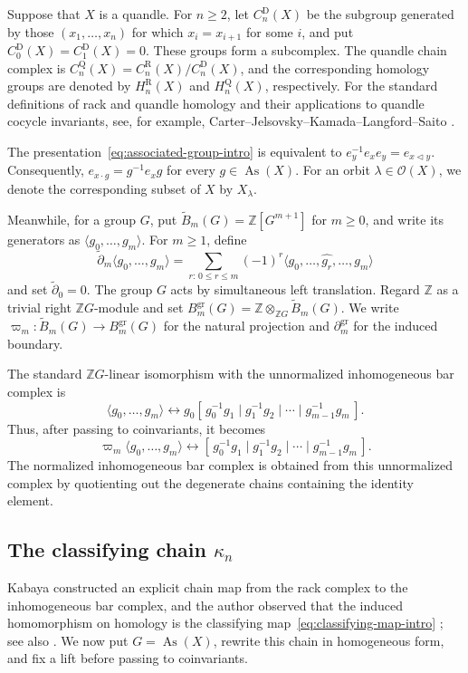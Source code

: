 \documentclass[11pt]{article}
\DeclareMathOperator{\As}{As}
\newcommand{\ZZ}{\mathbb Z}
\newcommand{\OO}{\mathcal O}
\newcommand{\tB}{\widetilde B}
\newcommand{\td}{\widetilde\partial}
\newcommand{\gr}{\mathrm{gr}}
\newcommand{\R}{\mathrm R}
\newcommand{\Q}{\mathrm Q}
\newcommand{\D}{\mathrm D}
\begin{document}
Suppose that $X$ is a quandle. For $n\ge2$, let $C_n^\D(X)$ be the subgroup generated by those $(x_1,\ldots,x_n)$ for which $x_i=x_{i+1}$ for some $i$, and put $C_0^\D(X)=C_1^\D(X)=0$. These groups form a subcomplex. The quandle chain complex is $C_n^\Q(X)=C_n^\R(X)/C_n^\D(X)$, and the corresponding homology groups are denoted by $H_n^\R(X)$ and $H_n^\Q(X)$, respectively. For the standard definitions of rack and quandle homology and their applications to quandle cocycle invariants, see, for example, Carter--Jelsovsky--Kamada--Langford--Saito \cite{CJKS}.

The presentation~\eqref{eq:associated-group-intro} is equivalent to $e_y^{-1}e_xe_y=e_{x\lhd y}$. Consequently, $e_{x\cdot g}=g^{-1}e_xg$ for every $g\in\As(X)$. For an orbit $\lambda\in\OO(X)$, we denote the corresponding subset of $X$ by $X_\lambda$.

Meanwhile, for a group $G$, put $\tB_m(G)=\ZZ[G^{m+1}]$ for $m\ge0$, and write its generators as $\langle g_0,\ldots,g_m\rangle$. For $m\ge1$, define
\[
\td_m\langle g_0,\ldots,g_m\rangle
        =
        \sum_{r:\,0\le r\le m}(-1)^r
        \langle g_0,\ldots,\widehat{g_r},\ldots,g_m\rangle
\]
and set $\td_0=0$. The group $G$ acts by simultaneous left translation. Regard $\ZZ$ as a trivial right $\ZZ G$-module and set $B_m^{\gr}(G)=\ZZ\otimes_{\ZZ G}\tB_m(G)$. We write $\varpi_m\colon\tB_m(G)\to B_m^{\gr}(G)$ for the natural projection and $\partial_m^{\gr}$ for the induced boundary.

The standard $\ZZ G$-linear isomorphism with the unnormalized inhomogeneous bar complex is
\[
\langle g_0,\ldots,g_m\rangle
 \longleftrightarrow
 g_0[\,g_0^{-1}g_1\mid g_1^{-1}g_2\mid\cdots\mid g_{m-1}^{-1}g_m\,].
\]
Thus, after passing to coinvariants, it becomes
\[
\varpi_m\langle g_0,\ldots,g_m\rangle
 \longleftrightarrow
 [\,g_0^{-1}g_1\mid g_1^{-1}g_2\mid\cdots\mid g_{m-1}^{-1}g_m\,].
\]
The normalized inhomogeneous bar complex is obtained from this unnormalized complex by quotienting out the degenerate chains containing the identity element.

\subsection{The classifying chain \texorpdfstring{$\kappa_n$}{kappa-n}}
\label{subsec:kappa-chain}

Kabaya constructed an explicit chain map from the rack complex to the inhomogeneous bar complex, and the author  observed that the induced homomorphism on homology is the classifying map~\eqref{eq:classifying-map-intro} \cite[\S8.4]{Kabaya}; see also \cite[\S6]{NosakaAdjoint}. We now put $G=\As(X)$, rewrite this chain in homogeneous form, and fix a lift before passing to coinvariants.
\end{document}
